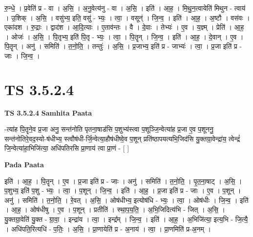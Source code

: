 \documentclass[17pt]{extarticle}
\begin{document}
रु॒न्धे॒ । प्र॒वेति॑ प्र - वा । अ॒सि॒ । अ॒नु॒वेत्य॑नु - वा । अ॒सि॒ । इति॑ । आ॒ह॒ । मि॒थु॒न॒त्वायेति॑ मिथुन - त्वाय॑ । उ॒शिक् । अ॒सि॒ । वसु॑भ्य॒ इति॒ वसु॑ - भ्यः॒ । त्वा॒ । वसून्॑ । जि॒न्व॒ । इति॑ । आ॒ह॒ । अ॒ष्टौ । वस॑वः । एका॑दश । रु॒द्राः । द्वाद॑श । आ॒दि॒त्याः । ए॒ताव॑न्तः । वै । दे॒वाः । तेभ्यः॑ । ए॒व । य॒ज्ञ्म् । प्रेति॑ । आ॒ह॒ । ओजः॑ । अ॒सि॒ । पि॒तृभ्य॒ इति॑ पि॒तृ - भ्यः॒ । त्वा॒ । पि॒तॄन् । जि॒न्व॒ । इति॑ । आ॒ह॒ । दे॒वान् । ए॒व । पि॒तॄन् । अनु॑ । समिति॑ । त॒नो॒ति॒ । तन्तुः॑ । अ॒सि॒ । प्र॒जाभ्य॒ इति॑ प्र - जाभ्यः॑ । त्वा॒ । प्र॒जा इति॑ प्र - जाः । जि॒न्व॒ ।  \newline




\section*{ TS 3.5.2.4 }

\textbf{TS 3.5.2.4 } \newline
\textbf{Samhita Paata} \newline

-त्या॑ह पि॒तॄने॒व प्र॒जा अनु॒ सन्त॑नोति पृतना॒षाड॑सि प॒शुभ्य॑स्त्वा प॒शूञ्जि॒न्वेत्या॑ह प्र॒जा ए॒व प॒शूननु॒ सन्त॑नोतिरे॒वद॒स्यो-ष॑धीभ्य॒ स्त्वौष॑धी-र्जि॒न्वेत्या॒हौष॑धीष्वे॒व प॒शून् प्रति॑ष्ठापयत्यभि॒जिद॑सि यु॒क्तग्रा॒वेन्द्रा॑य॒ त्वेन्द्रं॑ जि॒न्वेत्या॑हा॒भिजि॑त्या॒ अधि॑पतिरसि प्रा॒णाय॑ त्वा प्रा॒णं - [  ] \newline

\textbf{Pada Paata} \newline

इति॑ । आ॒ह॒ । पि॒तॄन् । ए॒व । प्र॒जा इति॑ प्र - जाः । अनु॑ । समिति॑ । त॒नो॒ति॒ । पृ॒त॒ना॒षाट् । अ॒सि॒ । प॒शुभ्य॒ इति॑ प॒शु - भ्यः॒ । त्वा॒ । प॒शून् । जि॒न्व॒ । इति॑ । आ॒ह॒ । प्र॒जा इति॑ प्र - जाः । ए॒व । प॒शून् । अनु॑ । समिति॑ । त॒नो॒ति॒ । रे॒वत् । अ॒सि॒ । ओष॑धीभ्य॒ इत्योष॑धि - भ्यः॒ । त्वा॒ । ओष॑धीः । जि॒न्व॒ । इति॑ । आ॒ह॒ । ओष॑धीषु । ए॒व । प॒शून् । प्रतीति॑ । स्था॒प॒य॒ति॒ । अ॒भि॒जिदित्य॑भि - जित् । अ॒सि॒ । यु॒क्तग्रा॒वेति॑ यु॒क्त - ग्रा॒वा॒ । इन्द्रा॑य । त्वा॒ । इन्द्र᳚म् । जि॒न्व॒ । इति॑ । आ॒ह॒ । अ॒भिजि॑त्या॒ इत्य॒भि - जि॒त्यै॒ । अधि॑पति॒रित्यधि॑ - प॒तिः॒ । अ॒सि॒ । प्रा॒णायेति॑ प्र - अ॒नाय॑ । त्वा॒ । प्रा॒णमिति॑ प्र-अ॒नम् ।  \newline




\end{document}
